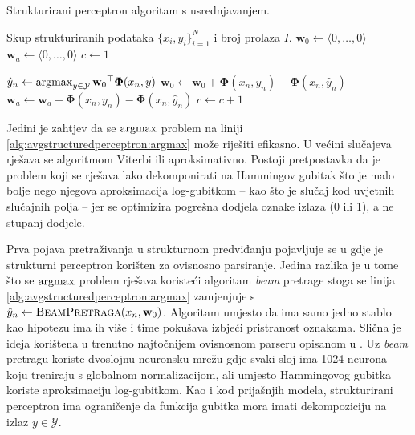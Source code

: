 \begin{algorithm}
\caption{Strukturirani perceptron algoritam s usrednjavanjem.}
\label{alg:avgstructuredperceptron}
\begin{algorithmic}[1]
\Require Skup strukturiranih podataka $\{x_i, y_i\}_{i=1}^N$ i broj prolaza $I$.
\State $\mathbf{w}_0 \gets \langle 0, \ldots, 0 \rangle$
\State $\mathbf{w}_a \gets \langle 0, \ldots, 0 \rangle$
\State $c \gets 1$

    \State $\hat{y}_n \gets \operatorname*{argmax}_{y \in \mathcal{Y}} {\mathbf{w}_0}^\top \mathbf{\Phi}(x_n, y)$ \label{alg:avgstructuredperceptron:argmax}
    \label{alg:structuredperceptron:condition}
    \State $\mathbf{w}_0 \gets \mathbf{w}_0 + \mathbf{\Phi}(x_n, y_n) - \mathbf{\Phi}(x_n, \hat{y}_n)$
    \State $\mathbf{w}_a \gets \mathbf{w}_a + \mathbf{\Phi}(x_n, y_n) - \mathbf{\Phi}(x_n, \hat{y}_n)$
    \EndIf
    \State $c \gets c + 1$
  \EndFor

\EndFor

\State {}
\end{algorithmic}
\end{algorithm}

Jedini je zahtjev da se $\operatorname*{argmax}$ problem na liniji
\ref{alg:avgstructuredperceptron:argmax} može riješiti efikasno. U većini
slučajeva rješava se algoritmom Viterbi ili aproksimativno. Postoji pretpostavka
da je problem koji se rješava lako dekomponirati na Hammingov gubitak što je
malo bolje nego njegova aproksimacija log-gubitkom -- kao što je slučaj kod
uvjetnih slučajnih polja -- jer se optimizira pogrešna dodjela oznake izlaza (0
ili 1), a ne stupanj dodjele.

Prva pojava pretraživanja u strukturnom predviđanju pojavljuje se u
\citep{collins2004incremental} gdje je strukturni perceptron korišten za
ovisnosno parsiranje. Jedina razlika je u tome što se $\operatorname*{argmax}$ problem rješava
koristeći algoritam \textit{beam} pretrage stoga se linija
\ref{alg:avgstructuredperceptron:argmax} zamjenjuje s $\hat{y}_n \gets
\textsc{BeamPretraga}(x_n, \mathbf{w}_0)$. Algoritam umjesto da ima samo jedno
stablo kao hipotezu ima ih više i time pokušava izbjeći pristranost oznakama.
Slična je ideja korištena u trenutno najtočnijem ovisnosnom parseru opisanom u
\citep{andor2016globally}. Uz \textit{beam} pretragu koriste dvoslojnu neuronsku
mrežu gdje svaki sloj ima 1024 neurona koju treniraju s globalnom
normalizacijom, ali umjesto Hammingovog gubitka koriste aproksimaciju
log-gubitkom. Kao i kod prijašnjih modela, strukturirani perceptron ima
ograničenje da funkcija gubitka mora imati dekompoziciju na izlaz $y \in
\mathcal{Y}$.
